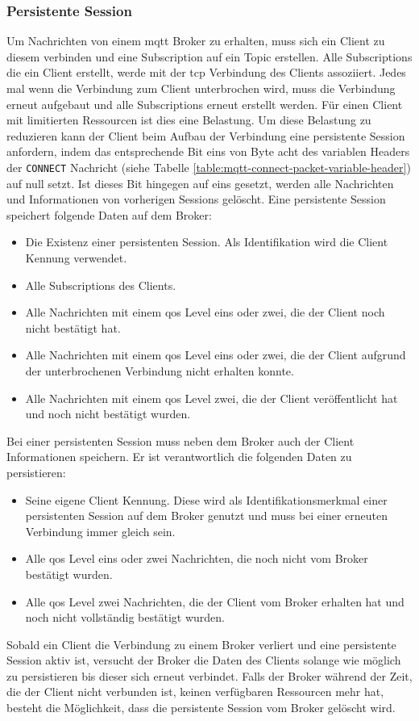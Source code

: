 \subsubsection{Persistente Session} \label{s:persistent-session}
Um Nachrichten von einem \ac{mqtt} Broker zu erhalten, muss sich ein Client zu diesem verbinden und eine Subscription auf ein Topic erstellen. Alle Subscriptions die ein Client erstellt, werde mit der \ac{tcp} Verbindung des Clients assoziiert.
Jedes mal wenn die Verbindung zum Client unterbrochen wird, muss die Verbindung erneut aufgebaut und alle Subscriptions erneut erstellt werden.
Für einen Client mit limitierten Ressourcen ist dies eine Belastung.
Um diese Belastung zu reduzieren kann der Client beim Aufbau der Verbindung eine persistente Session anfordern, indem das entsprechende Bit eins von Byte acht des variablen Headers der \verb|CONNECT| Nachricht (siehe Tabelle \ref{table:mqtt-connect-packet-variable-header}) auf null setzt.
Ist dieses Bit hingegen auf eins gesetzt, werden alle Nachrichten und Informationen von vorherigen Sessions gelöscht.
Eine persistente Session speichert folgende Daten auf dem Broker:
\begin{itemize}
    \item Die Existenz einer persistenten Session. Als Identifikation wird die Client Kennung verwendet.
    \item Alle Subscriptions des Clients.
    \item Alle Nachrichten mit einem \ac{qos} Level eins oder zwei, die der Client noch nicht bestätigt hat.
    \item Alle Nachrichten mit einem \ac{qos} Level eins oder zwei, die der Client aufgrund der unterbrochenen Verbindung nicht erhalten konnte.
    \item Alle Nachrichten mit einem \ac{qos} Level zwei, die der Client veröffentlicht hat und noch nicht bestätigt wurden.
\end{itemize}
Bei einer persistenten Session muss neben dem Broker auch der Client Informationen speichern. Er ist verantwortlich die folgenden Daten zu persistieren:
\begin{itemize}
    \item Seine eigene Client Kennung. Diese wird als Identifikationsmerkmal einer persistenten Session auf dem Broker genutzt und muss bei einer erneuten Verbindung immer gleich sein.
    \item Alle \ac{qos} Level eins oder zwei Nachrichten, die noch nicht vom Broker bestätigt wurden.
    \item Alle \ac{qos} Level zwei Nachrichten, die der Client vom Broker erhalten hat und noch nicht vollständig bestätigt wurden.
\end{itemize}
Sobald ein Client die Verbindung zu einem Broker verliert und eine persistente Session aktiv ist, versucht der Broker die Daten des Clients solange wie möglich zu persistieren bis dieser sich erneut verbindet. Falls der Broker während der Zeit, die der Client nicht verbunden ist, keinen verfügbaren Ressourcen mehr hat, besteht die Möglichkeit, dass die persistente Session vom Broker gelöscht wird.
\cite{teamPersistentSessionQueuing}

